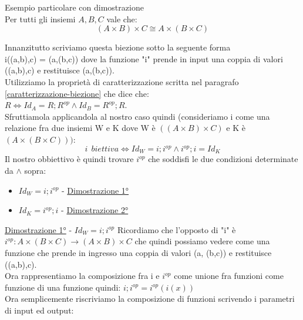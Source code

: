 \begin{example} Esempio particolare con dimostrazione \\
        Per tutti gli insiemi $A, B, C$ vale che:
        \begin{equation}
            (A \times B) \times C \cong A \times (B \times C)
        \end{equation}
        \begin{demostration}
            Innanzitutto scriviamo questa biezione sotto la seguente forma \\i((a,b),c) = (a,(b,c)) dove la funzione "i" prende in input una coppia di valori ((a,b),c) e restituisce (a,(b,c)).\\
            Utilizziamo la proprietà di caratterizzazione scritta nel paragrafo \ref{caratterizzazione-biezione} che dice che: \\ $R \Longleftrightarrow Id_A = R;R^{op} \land Id_B = R^{op};R$.\\
            Sfruttiamola applicandola al nostro caso quindi (consideriamo i come una relazione fra due insiemi W e K dove W è $((A \times B) \times C)$ e K è $(A \times (B \times C)))$:
            \begin{equation}
                i \: \: biettiva \Longleftrightarrow Id_W = i;i^{op} \land i^{op};i = Id_K
            \end{equation}
            Il nostro obbiettivo è quindi trovare $i^{op}$ che soddisfi le due condizioni determinate da $\land$ sopra:
            \begin{itemize}
                \item $Id_W = i;i^{op}$ - \underline{Dimostrazione 1°}
                \item $Id_K = i^{op};i$ - \underline{Dimostrazione 2°}
            \end{itemize}
                \underline{Dimostrazione 1°} - $Id_W = i;i^{op}$
                Ricordiamo che l'opposto di "i" è $i^{op}: A \times (B \times C) \longrightarrow (A \times B) \times C$ che quindi possiamo vedere come una funzione che prende in ingresso una coppia di valori (a, (b,c)) e restituisce ((a,b),c).\\
                Ora rappresentiamo la composizione fra i e $i^{op}$ come unione fra funzioni come funzione di una funzione quindi: $i;i^{op} = i^{op}(i(x))$\\
                Ora semplicemente riscriviamo la composizione di funzioni scrivendo i parametri di input ed output:
                \begin{equation}

\end{equation}
\end{demostration}
\end{example}
